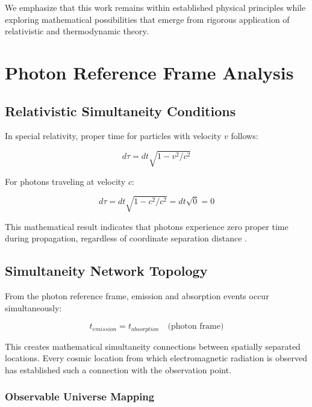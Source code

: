 \documentclass[12pt,a4paper]{article}
\begin{document}
We emphasize that this work remains within established physical principles while exploring mathematical possibilities that emerge from rigorous application of relativistic and thermodynamic theory.

\section{Photon Reference Frame Analysis}

\subsection{Relativistic Simultaneity Conditions}

In special relativity, proper time for particles with velocity $v$ follows:

\begin{equation}
d\tau = dt\sqrt{1-v^2/c^2}
\label{eq:proper_time}
\end{equation}

For photons traveling at velocity $c$:

\begin{equation}
d\tau = dt\sqrt{1-c^2/c^2} = dt\sqrt{0} = 0
\label{eq:photon_proper_time}
\end{equation}

This mathematical result indicates that photons experience zero proper time during propagation, regardless of coordinate separation distance \cite{rindler2001introduction}.

\subsection{Simultaneity Network Topology}

From the photon reference frame, emission and absorption events occur simultaneously:

\begin{equation}
t_{emission} = t_{absorption} \quad \text{(photon frame)}
\label{eq:simultaneity}
\end{equation}

This creates mathematical simultaneity connections between spatially separated locations. Every cosmic location from which electromagnetic radiation is observed has established such a connection with the observation point.

\subsubsection{Observable Universe Mapping}
\end{document}
